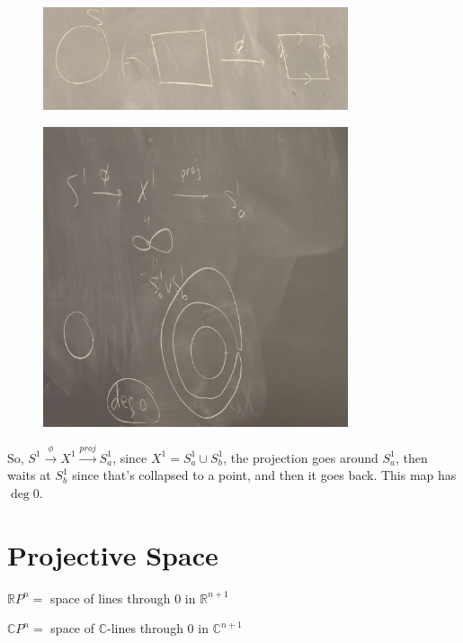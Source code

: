 \documentclass{article}
\theoremstyle{definition}
\begin{document}
    \begin{figure}[H]
        \centering
        \includegraphics[width=0.8\textwidth]{img/S1map.jpg}
        \caption{}
    \end{figure}

    \begin{figure}[H]
        \centering
        \includegraphics[width=0.8\textwidth]{img/deg0.jpg}
        \caption{}
    \end{figure}

    So, \(S^1 \xrightarrow{\phi} X^1 \xrightarrow{proj} S_a^1\), since \(X^1 = S_a^1 \cup S_b^1\), the projection goes around \(S_a^1\), then waits at \(S_b^1\) since that's collapsed to a point, and then it goes back. This map has \(\deg 0\).  

    \section*{Projective Space}

    \(\mathbb{R} P^n =\) space of lines through \(0\) in \(\mathbb{R}^{n+1}\)
    
    \(\mathbb{C}P^n =\) space of \(\mathbb{C}\)-lines through \(0\) in \(\mathbb{C}^{n+1}\)
\end{document}
